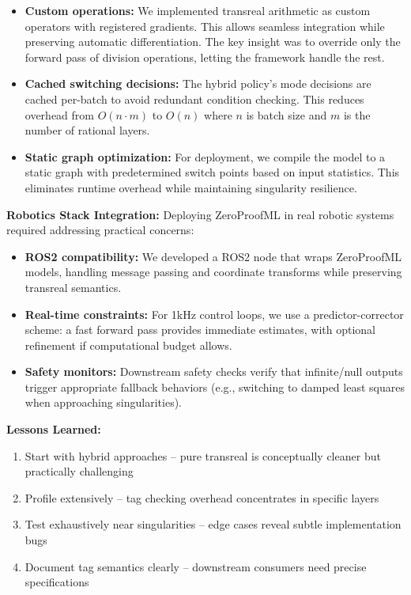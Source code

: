 \documentclass[twoside,11pt]{article}
\begin{document}
\begin{itemize}
\item \textbf{Custom operations:} We implemented transreal arithmetic as custom operators with registered gradients. This allows seamless integration while preserving automatic differentiation. The key insight was to override only the forward pass of division operations, letting the framework handle the rest.

\item \textbf{Cached switching decisions:} The hybrid policy's mode decisions are cached per-batch to avoid redundant condition checking. This reduces overhead from $O(n \cdot m)$ to $O(n)$ where $n$ is batch size and $m$ is the number of rational layers.

\item \textbf{Static graph optimization:} For deployment, we compile the model to a static graph with predetermined switch points based on input statistics. This eliminates runtime overhead while maintaining singularity resilience.
\end{itemize}

\textbf{Robotics Stack Integration:}
Deploying ZeroProofML in real robotic systems required addressing practical concerns:

\begin{itemize}
\item \textbf{ROS2 compatibility:} We developed a ROS2 node that wraps ZeroProofML models, handling message passing and coordinate transforms while preserving transreal semantics.

\item \textbf{Real-time constraints:} For 1kHz control loops, we use a predictor-corrector scheme: a fast forward pass provides immediate estimates, with optional refinement if computational budget allows.

\item \textbf{Safety monitors:} Downstream safety checks verify that infinite/null outputs trigger appropriate fallback behaviors (e.g., switching to damped least squares when approaching singularities).
\end{itemize}

\textbf{Lessons Learned:}
\begin{enumerate}
\item Start with hybrid approaches -- pure transreal is conceptually cleaner but practically challenging
\item Profile extensively -- tag checking overhead concentrates in specific layers
\item Test exhaustively near singularities -- edge cases reveal subtle implementation bugs
\item Document tag semantics clearly -- downstream consumers need precise specifications
\end{enumerate}
\end{document}
